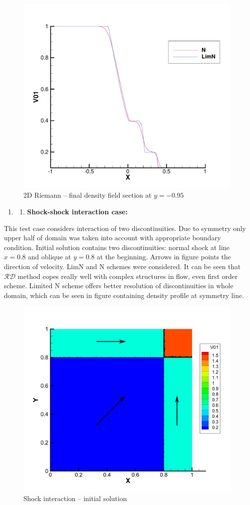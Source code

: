 \documentclass[plainboxedsections, 17pt, b1]{sciposter}
\newcommand{\rd}{$\mathcal{RD}$}
\begin{document}
\begin{multicols}{3}
\begin{figure}%
	\centering 
	\includegraphics[width=0.6\columnwidth]{img/riemann2d_section.pdf} 
	\caption{2D Riemann -- final density field section at $y=-0.95$ }%
\end{figure}
\begin{enumerate}\addtocounter{enumi}{1}
	\item \begin{enumerate}\addtocounter{enumii}{1}
		\item \textbf{ Shock-shock interaction case: }
	\end{enumerate}
\end{enumerate}

This test case considers interaction of two discontinuities. Due to symmetry only upper half of domain was taken into account with appropriate boundary condition. Initial solution contains two discontinuities: normal shock at line $x=0.8$ and oblique at $y=0.8$ at the beginning. Arrows in figure points the direction of velocity. LimN and N schemes were considered. It can be seen that \rd{} method copes really well with complex structures in flow, even first order scheme. Limited N scheme offers better resolution of discontinuities in whole domain, which can be seen in figure containing density profile at symmetry line.


\begin{figure}%
	\centering
	\includegraphics[width=0.65\columnwidth]{img/euler2shock_initial_ink.pdf}%
	\caption{Shock interaction -- initial solution}%
\end{figure}


\end{multicols}
\end{document}
